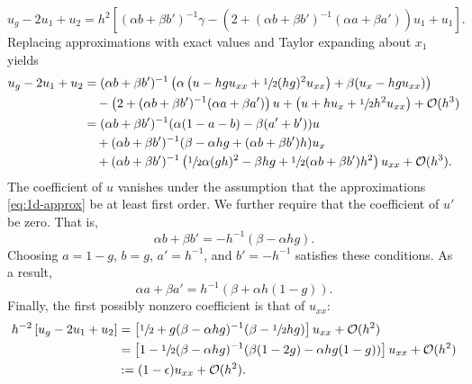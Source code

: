 \begin{equation}
    u_g - 2u_1 + u_2
    = h^2\left[(\alpha b + \beta b')^{-1}\gamma - \left(2 + (\alpha b + \beta b')^{-1}(\alpha a + \beta a')\right)u_1 + u_1\right].
    \label{eq:1d-3ptl}
\end{equation}
Replacing approximations with exact values and Taylor expanding about $x_1$ yields
\begin{equation}
    \begin{aligned}
        u_g - 2u_1 + u_2
        &= (\alpha b + \beta b')^{-1}\left(\alpha\left(u-hgu_{xx} + \sfrac12(hg)^2 u_{xx}\right) + \beta(u_x - hgu_{xx})\right) \\
        &\quad -\left(2+(\alpha b+\beta b')^{-1}(\alpha a + \beta a')\right)u + \left(u + hu_x + \sfrac12 h^2u_{xx}\right) + \mathcal{O}(h^3) \\
        &= (\alpha b + \beta b')^{-1}(\alpha(1-a-b) - \beta(a'+b'))u \\
        &\quad +(\alpha b + \beta b')^{-1}(\beta - \alpha hg + (\alpha b + \beta b')h)u_x \\
        &\quad +(\alpha b + \beta b')^{-1}\left(\sfrac12\alpha(gh)^2-\beta hg +\sfrac12(\alpha b + \beta b')h^2\right)u_{xx} + \mathcal{O}(h^3).
    \end{aligned}
\end{equation}
The coefficient of $u$ vanishes under the assumption that the approximations
\eqref{eq:1d-approx} be at least first order. We further require that the coefficient of
$u'$ be zero. That is,
\begin{equation*}
    \alpha b + \beta b' = -h^{-1}(\beta-\alpha hg).
\end{equation*}
Choosing $a=1-g$, $b=g$, $a'=h^{-1}$, and $b'=-h^{-1}$ satisfies these conditions. As a
result,
\begin{equation*}
    \alpha a + \beta a' = h^{-1}(\beta + \alpha h(1-g)).
\end{equation*}
Finally, the first possibly nonzero coefficient is that of $u_{xx}$:
\begin{equation}
    \begin{aligned}
        h^{-2}\left[u_g - 2u_1 + u_2\right]
        &= \left[\sfrac12 + g(\beta-\alpha hg)^{-1}(\beta-\sfrac12 hg)\right]u_{xx} + \mathcal{O}(h^2) \\
        &= \left[1-\sfrac12(\beta-\alpha hg)^{-1}(\beta(1-2g)-\alpha hg(1-g))\right]u_{xx} + \mathcal{O}(h^2) \\
        &:= (1-\epsilon)u_{xx} + \mathcal{O}(h^2).
    \end{aligned}
    \label{eq:lap-error}
\end{equation}
